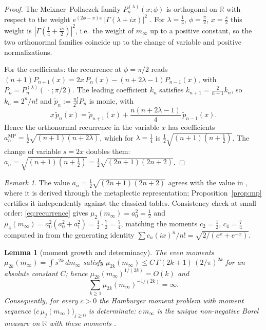 \documentclass[11pt]{amsart}
\newtheorem{lemma}[theorem]{Lemma}
\theoremstyle{definition}
\theoremstyle{remark}
\newtheorem{remark}[theorem]{Remark}
\newcommand{\bbR}{\mathbb{R}}
\newcommand{\minf}{m_\infty}
\begin{document}
\begin{proof}
The Meixner--Pollaczek family $P^{(\lambda)}_n(x;\phi)$ is orthogonal on
$\bbR$ with respect to the weight
$e^{(2\phi-\pi)x}\,|\Gamma(\lambda+ix)|^{2}$ \cite[\S9.7]{KLS}. For
$\lambda=\tfrac14$, $\phi=\tfrac\pi2$, $x=\tfrac s2$ this weight is
$|\Gamma(\tfrac14+\tfrac{is}{2})|^{2}$, i.e.\ the weight of $\minf$ up to a
positive constant, so the two orthonormal families coincide up to the change
of variable and positive normalizations.

For the coefficients: the recurrence \cite[(9.7.3)]{KLS} at $\phi=\pi/2$
reads $(n+1)P_{n+1}(x)=2x\,P_n(x)-(n+2\lambda-1)P_{n-1}(x)$, with
$P_n=P^{(\lambda)}_n(\,\cdot\,;\pi/2)$. The leading coefficient $k_n$
satisfies $k_{n+1}=\tfrac{2}{n+1}k_n$, so $k_n=2^{n}/n!$ and
$\tilde p_n:=\tfrac{n!}{2^{n}}P_n$ is monic, with
\[
x\,\tilde p_n(x)
=\tilde p_{n+1}(x)+\frac{n(n+2\lambda-1)}{4}\,\tilde p_{n-1}(x).
\]
Hence the orthonormal recurrence in the variable $x$ has coefficients
$a^{\mathrm{MP}}_n=\tfrac12\sqrt{(n+1)(n+2\lambda)}$, which for
$\lambda=\tfrac14$ is $\tfrac12\sqrt{(n+1)(n+\tfrac12)}$. The change of
variable $s=2x$ doubles them:
$a_n=\sqrt{(n+1)(n+\tfrac12)}=\tfrac12\sqrt{(2n+1)(2n+2)}$.
\end{proof}

\begin{remark}
The value $a_n=\tfrac12\sqrt{(2n+1)(2n+2)}$ agrees with the value
in \cite[Prop.~3.3, Thm.~5.2(i)]{CCMprolate}, where it is derived through the metaplectic
representation; Proposition~\ref{prop:mp} certifies it independently against
the classical tables. Consistency check at small order:
\eqref{eq:recurrence} gives $\mu_2(\minf)=a_0^{2}=\tfrac12$ and
$\mu_4(\minf)=a_0^{2}(a_0^{2}+a_1^{2})=\tfrac12\cdot\tfrac72=\tfrac74$,
matching the moments $c_2=\tfrac12$, $c_4=\tfrac74$ computed in
\cite[Prop.~5.2]{CCMprolate} from the generating identity
$\sum c_n(ix)^{n}/n!=\sqrt{2/(e^{x}+e^{-x})}$.
\end{remark}

\begin{lemma}[moment growth and determinacy]\label{lem:carleman}
The even moments $\mu_{2k}(\minf)=\int s^{2k}\,d\minf$ satisfy
$\mu_{2k}(\minf)\le C\,\Gamma(2k+1)\,(2/\pi)^{2k}$ for an absolute constant
$C$; hence $\mu_{2k}(\minf)^{1/(2k)}=O(k)$ and
\[
\sum_{k\ge1}\mu_{2k}(\minf)^{-1/(2k)}=\infty .
\]
Consequently, for every $c>0$ the Hamburger moment problem with
moment sequence $\bigl(c\,\mu_j(\minf)\bigr)_{j\ge0}$ is determinate: $c\,\minf$ is
the unique non-negative Borel measure on $\bbR$ with these moments
\cite{Carleman,Akhiezer,Simon}.
\end{lemma}
\end{document}
